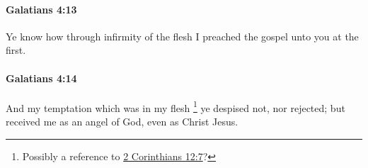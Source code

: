 		\paragraph{Galatians 4:13} %
			\label{GALATIANS-4-13}

			Ye know how through infirmity of the flesh I preached the gospel unto you at the first.

			\begin{framed}
			\scriptsize
				\begin{compactdesc}
					\item[SBLG] 
				\end{compactdesc}
			\end{framed}

		\paragraph{Galatians 4:14} %
			\label{GALATIANS-4-14}

			And my temptation which was in my flesh%
				\footnote{%
					Possibly a reference to \hyperref[2CORINTHIANS-12-7]{2 Corinthians 12:7}?
					}
			ye despised not, nor rejected; but received me as an angel of God, even as Christ Jesus.

